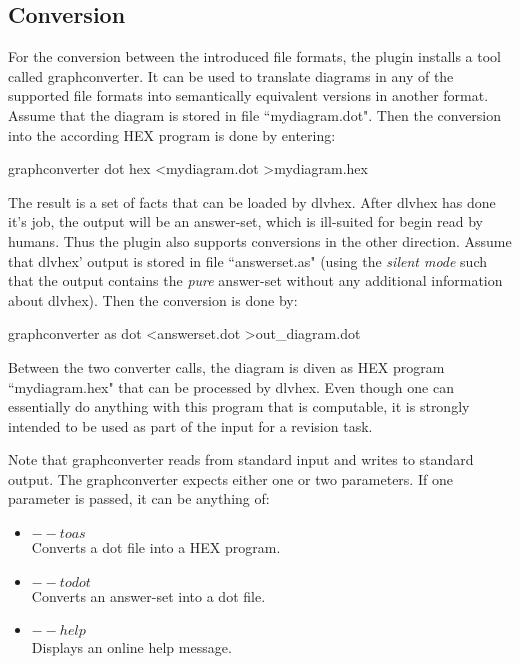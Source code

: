 \documentclass[a4paper,11pt]{article}
\theoremstyle{definition}
\newcommand{\hex}{\textsf{HEX}\xspace }
\newcommand{\dlvhex}{\textsf{dlvhex}\xspace }
\newcommand{\dotff}{\textsf{dot}\xspace }
\newcommand{\inlinecode}[1]{\textsf{#1}\xspace }
\begin{document}
		\subsection{Conversion}
		\label{sec:Conversion:Converstion}

			For the conversion between the introduced file formats, the plugin installs a tool called \inlinecode{graphconverter}.
			It can be used to translate diagrams in any of the supported file formats into semantically equivalent versions in another format.
			Assume that the diagram is stored in file ``mydiagram.dot". Then the conversion into the according \hex program is done by entering:
			\begin{center}
				\inlinecode{graphconverter dot hex \textless mydiagram.dot \textgreater mydiagram.hex}
			\end{center}

			The result is a set of facts that can be loaded by \dlvhex. After \dlvhex has done it's job, the output will be an answer-set, which is ill-suited for begin read by humans. Thus the plugin
			also supports conversions in the other direction. Assume that \dlvhex' output is stored in file ``answerset.as" (using the \emph{silent mode} such that the output contains
			the \emph{pure} answer-set without any additional information about \dlvhex). Then the conversion is done by:
			\begin{center}
				\inlinecode{graphconverter as dot \textless answerset.dot \textgreater out\_diagram.dot}
			\end{center}

			Between the two converter calls, the diagram is diven as \hex program ``mydiagram.hex" that can be processed by \dlvhex. Even though one can essentially do anything
			with this program that is computable, it is strongly intended to be used as part of the input for a revision task.

			Note that \inlinecode{graphconverter} reads from standard input and writes to standard output.
			The \inlinecode{graphconverter} expects either one or two parameters. If one parameter is passed, it can be anything of:
			\begin{itemize}
				\item $--toas$ \\
					Converts a \dotff file into a \hex program.
				\item $--todot$ \\
					Converts an answer-set into a \dotff file.
				\item $--help$ \\
					Displays an online help message.
			\end{itemize}
\end{document}
